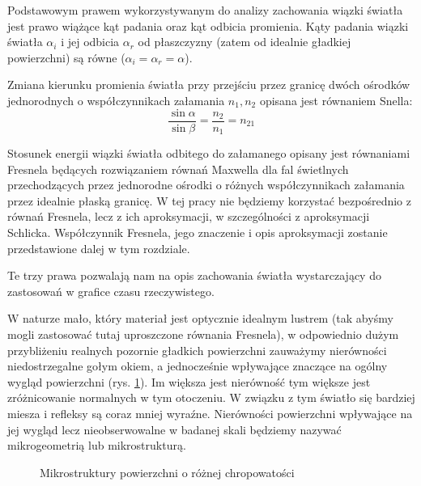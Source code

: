 \documentclass[../main.tex]{subfiles}
\begin{document}
Podstawowym prawem wykorzystywanym do analizy zachowania wiązki światła jest prawo wiążące kąt padania oraz kąt odbicia promienia. Kąty padania wiązki światła $\alpha_i$ i jej odbicia $\alpha_r$ od płaszczyzny (zatem od idealnie gładkiej powierzchni) są równe ($\alpha_i = \alpha_r = \alpha$).


Zmiana kierunku promienia światła przy przejściu przez granicę dwóch ośrodków jednorodnych o współczynnikach załamania $n_1, n_2$ opisana jest równaniem Snella:
\[
\frac{\sin\alpha}{\sin\beta} =
  \frac{n_2}{n_1} = n_{21}
\]

Stosunek energii wiązki światła odbitego do załamanego opisany jest równaniami Fresnela będących rozwiązaniem równań Maxwella dla fal świetlnych przechodzących przez jednorodne ośrodki o różnych współczynnikach załamania przez idealnie płaską granicę. W tej pracy nie będziemy korzystać bezpośrednio z równań Fresnela, lecz z ich aproksymacji, w szczególności z aproksymacji Schlicka. Współczynnik Fresnela, jego znaczenie i opis aproksymacji zostanie przedstawione dalej w tym rozdziale.

Te trzy prawa pozwalają nam na opis zachowania światła wystarczający do zastosowań w grafice czasu rzeczywistego.

W naturze mało, który materiał jest optycznie idealnym lustrem (tak abyśmy mogli zastosować tutaj uproszczone równania Fresnela), w odpowiednio dużym przybliżeniu realnych pozornie gładkich powierzchni zauważymy nierówności niedostrzegalne gołym okiem, a jednocześnie wpływające znaczące na ogólny wygląd powierzchni (rys. \ref{fig:Microstructure}). Im większa jest nierówność tym większe jest zróżnicowanie normalnych w tym otoczeniu. W związku z tym światło się bardziej miesza i refleksy są coraz mniej wyraźne. Nierówności powierzchni wpływające na jej wygląd lecz nieobserwowalne w badanej skali będziemy nazywać mikrogeometrią lub mikrostrukturą.

\begin{figure}[ht]
  \centering
  \vspace{0.25cm}
  \caption{Mikrostruktury powierzchni o różnej chropowatości}
	\label{fig:Microstructure}
\end{figure}
\end{document}
